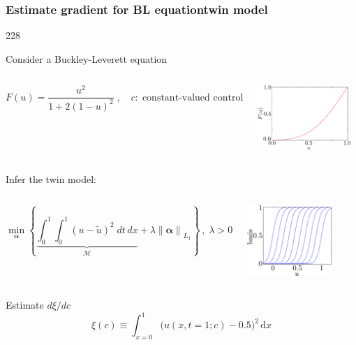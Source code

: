 \documentclass{beamer}
\let\oldcite=\cite
\renewcommand{\cite}[1]{\textcolor[rgb]{.4,.4,.85}{\oldcite{#1}}}
\newcommand{\barrow}{\item[\color{darkred}\ding{228}]}
\begin{document}
\begin{frame}
    \frametitle{Estimate gradient for BL equation\hfill \scriptsize{twin model}}\small
    \begin{dinglist}{228}
    \barrow 
    Consider a Buckley-Leverett equation \scriptsize \cite{Buckley 42}\small
    \begin{columns}
        $$
            F(u) = \frac{u^2}{1+2(1-u)^2} \;,\quad c: \;\textrm{constant-valued control}
        $$
        \begin{center}
            \includegraphics[width=3.5cm]{Buckley_flux.png}
        \end{center}
    \end{columns}
    \vspace{-.3cm}
    \barrow Infer the twin model:
    \begin{columns}
        $$
            \min_{\boldsymbol{\alpha}}\left\{ \underbrace{\int_0^1\int_0^1\left(u-\tilde{u}\right)^2\; dt\,dx}_{\mathcal{M}} + \lambda \left\|\boldsymbol{\alpha}\right\|_{L_1}\right\}\,,
            \; \lambda > 0
        $$
        \begin{center}
        \includegraphics[width=3.2cm]{fixed_basis_eg.png}
        \end{center}
    \end{columns}
    \vspace{-.3cm}
    \barrow
    Estimate $d\xi\slash dc\quad$ \scriptsize \cite{Kucuk 06}\small\\
    $$
        \xi(c) \equiv \int_{x=0}^1 \big(u(x,t=1;c) - 0.5\big)^2 \,\textrm{d}x
    $$
    \end{dinglist}
\end{frame}
\end{document}
